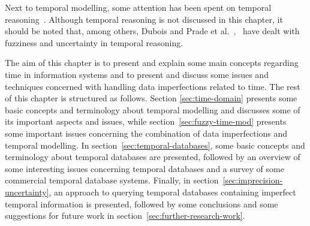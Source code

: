 Next to temporal modelling, some attention has been spent on temporal reasoning~\cite{Allen83}. Although temporal reasoning is not discussed in this chapter, it should be noted that, among others, Dubois and Prade et al.~\cite{Dubois:jucs_9_9:fuzziness_and_uncertainty_in},~\cite{Dubois89} have dealt with fuzziness and uncertainty in temporal reasoning.

The aim of this chapter is to present and explain some main concepts regarding time in information systems and to present and discuss some issues and techniques concerned with handling data imperfections related to time. The rest of this chapter is structured as follows. Section \ref{sec:time-domain} presents some basic concepts and terminology about temporal modelling and discusses some of its important aspects and issues, while section~\ref{sec:fuzzy-time-mod} presents some important issues concerning the combination of data imperfections and temporal modelling. In section~\ref{sec:temporal-databases}, some basic concepts and terminology about temporal databases are presented, followed by an overview of some interesting issues concerning temporal databases and a survey of some commercial temporal database systems. Finally, in section~\ref{sec:imprecision-uncertainty}, an approach to querying temporal databases containing imperfect temporal information is presented, followed by some conclusions and some suggestions for future work in section~\ref{sec:further-research-work}.



